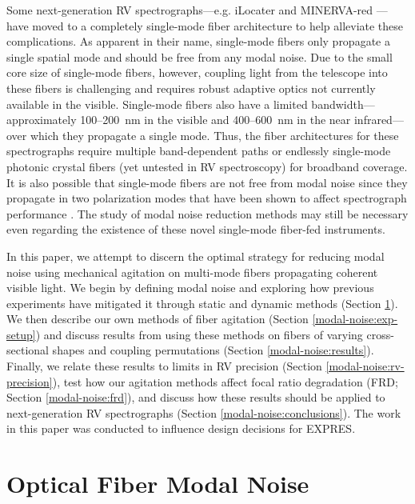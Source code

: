 Some next-generation RV spectrographs---e.g. iLocater \citep{crepp_ilocater_2016} and MIN\-ERVA-red \citep{blake_minerva-red_2015}---have moved to a completely single-mode fiber architecture to help alleviate these complications. As apparent in their name, single-mode fibers only propagate a single spatial mode and should be free from any modal noise. Due to the small core size of single-mode fibers, however, coupling light from the telescope into these fibers is challenging and requires robust adaptive optics not currently available in the visible. Single-mode fibers also have a limited bandwidth---approximately 100--\SI{200}{\nano\meter} in the visible and 400--\SI{600}{\nano\meter} in the near infrared---over which they propagate a single mode. Thus, the fiber architectures for these spectrographs require multiple band-dependent paths or endlessly single-mode photonic crystal fibers (yet untested in RV spectroscopy) for broadband coverage. It is also possible that single-mode fibers are not free from modal noise since they propagate in two polarization modes that have been shown to affect spectrograph performance \citep{halverson_modal_2015}. The study of modal noise reduction methods may still be necessary even regarding the existence of these novel single-mode fiber-fed instruments.

In this paper, we attempt to discern the optimal strategy for reducing modal noise using mechanical agitation on multi-mode fibers propagating coherent visible light. We begin by defining modal noise and exploring how previous experiments have mitigated it through static and dynamic methods (Section \ref{modal-noise:mn}). We then describe our own methods of fiber agitation (Section \ref{modal-noise:exp-setup}) and discuss results from using these methods on fibers of varying cross-sectional shapes and coupling permutations (Section \ref{modal-noise:results}). Finally, we relate these results to limits in RV precision (Section \ref{modal-noise:rv-precision}), test how our agitation methods affect focal ratio degradation (FRD; Section {\ref{modal-noise:frd}}), and discuss how these results should be applied to next-generation RV spectrographs (Section \ref{modal-noise:conclusions}). The work in this paper was conducted to influence design decisions for EXPRES.

\section{Optical Fiber Modal Noise}
\label{modal-noise:mn}

